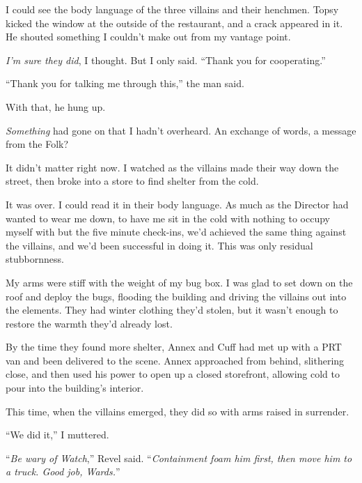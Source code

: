 I could see the body language of the three villains and their henchmen.  Topsy kicked the window at the outside of the restaurant, and a crack appeared in it.  He shouted something I couldn't make out from my vantage point.



\emph{I'm sure they did}, I thought.  But I only said.  ``Thank you for cooperating.''



``Thank you for talking me through this,'' the man said.



With that, he hung up.



\emph{Something} had gone on that I hadn't overheard.  An exchange of words, a message from the Folk?



It didn't matter right now.  I watched as the villains made their way down the street, then broke into a store to find shelter from the cold.



It was over.  I could read it in their body language.  As much as the Director had wanted to wear me down, to have me sit in the cold with nothing to occupy myself with but the five minute check-ins, we'd achieved the same thing against the villains, and we'd been successful in doing it.  This was only residual stubbornness.



My arms were stiff with the weight of my bug box.  I was glad to set down on the roof and deploy the bugs, flooding the building and driving the villains out into the elements.  They had winter clothing they'd stolen, but it wasn't enough to restore the warmth they'd already lost.



By the time they found more shelter, Annex and Cuff had met up with a PRT van and been delivered to the scene.  Annex approached from behind, slithering close, and then used his power to open up a closed storefront, allowing cold to pour into the building's interior.



This time, when the villains emerged, they did so with arms raised in surrender.



``We did it,'' I muttered.



``\emph{Be wary of Watch},'' Revel said.  ``\emph{Containment foam him first, then move him to a truck.  Good job, Wards.}''



